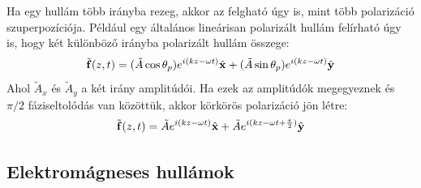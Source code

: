 \documentclass[a4paper,12pt]{article}
\begin{document}
Ha egy hullám több irányba rezeg, akkor az felgható úgy is, mint több polarizáció szuperpozíciója. Például egy általános lineárisan polarizált hullám felírható úgy is, hogy két különböző irányba polarizált hullám összege:
\begin{equation}
    \tilde{\bold{f}}(z, t) = (\tilde{A} \cos \theta_p) e^{i(kz - \omega t)}\hat{\bold{x}} + (\tilde{A} \sin \theta_p) e^{i(kz - \omega t)}\hat{\bold{y}}
\end{equation}
Ahol $\tilde{A}_x$ és $\tilde{A}_y$ a két irány amplitúdói. Ha ezek az amplitúdók megegyeznek és $\pi/2$ fáziseltolódás van közöttük, akkor körkörös polarizáció jön létre:
\begin{equation}
    \tilde{\bold{f}}(z, t) = \tilde{A} e^{i(kz - \omega t)}\hat{\bold{x}} + \tilde{A} e^{i(kz - \omega t + \frac{\pi}{2})}\hat{\bold{y}}
\end{equation}

\subsection{Elektromágneses hullámok}
\end{document}
